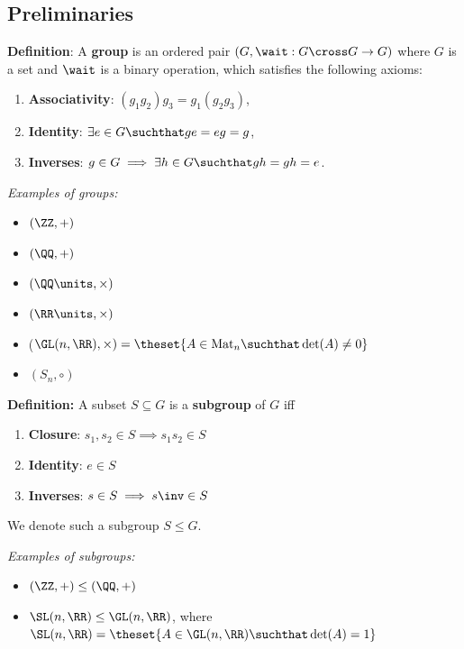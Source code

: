 \hypertarget{preliminaries}{%
\subsection{Preliminaries}\label{preliminaries}}

\textbf{Definition}: A \textbf{group} is an ordered pair
\((G, \wait: G\cross G \to G)\) where \(G\) is a set and \(\wait\) is a
binary operation, which satisfies the following axioms:

\begin{enumerate}
\def\labelenumi{\arabic{enumi}.}
\item
  \textbf{Associativity}: \((g_1 g_2)g_3 = g_1(g_2 g_3)\),
\item
  \textbf{Identity}: \(\exists e\in G \suchthat ge = eg = g\),
\item
  \textbf{Inverses}:
  \(g\in G \implies \exists h\in G \suchthat gh = gh = e\).
\end{enumerate}

\emph{Examples of groups:}

\begin{itemize}
\item
  \((\ZZ, +)\)
\item
  \((\QQ, +)\)
\item
  \((\QQ\units, \times)\)
\item
  \((\RR\units, \times)\)
\item
  (\(\GL(n, \RR), \times) = \theset{A \in \mathrm{Mat}_n \suchthat \det(A) \neq 0}\)
\item
  \((S_n, \circ)\)
\end{itemize}

\textbf{Definition:} A subset \(S \subseteq G\) is a \textbf{subgroup}
of \(G\) iff

\begin{enumerate}
\def\labelenumi{\arabic{enumi}.}
\item
  \textbf{Closure}: \(s_1, s_2 \in S \implies s_1 s_2 \in S\)
\item
  \textbf{Identity}: \(e\in S\)
\item
  \textbf{Inverses}: \(s\in S \implies s\inv \in S\)
\end{enumerate}

We denote such a subgroup \(S \leq G\).

\emph{Examples of subgroups:}

\begin{itemize}
\item
  \((\ZZ, +) \leq (\QQ, +)\)
\item
  \(\SL(n, \RR) \leq \GL(n, \RR)\), where
  \(\SL(n, \RR) = \theset{A\in \GL(n, \RR) \suchthat \det(A) = 1}\)
\end{itemize}

